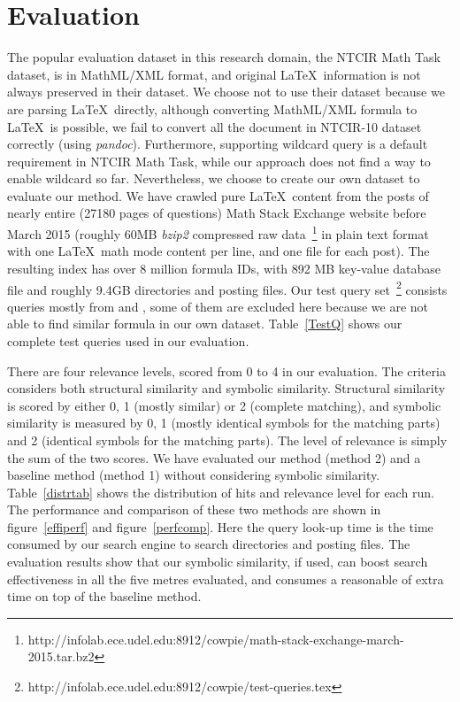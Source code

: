 \documentclass{acm_proc_article-sp}
\begin{document}
\section{Evaluation}
The popular evaluation dataset in this research domain, the NTCIR Math Task dataset, is in MathML/XML format, and original \LaTeX\ information is not always preserved in their dataset. 
We choose not to use their dataset because we are parsing \LaTeX\ directly, although converting MathML/XML formula to \LaTeX\ is possible, we fail to convert all the document in NTCIR-10 dataset correctly (using \textit{pandoc}).
Furthermore, supporting wildcard query is a default requirement in NTCIR Math Task, while our approach does not find a way to enable wildcard so far.
Nevertheless, we choose to create our own dataset to evaluate our method.
We have crawled pure \LaTeX\ content from the posts of nearly entire (27180 pages of questions) Math Stack Exchange website before March 2015 (roughly 60MB \textit{bzip2} compressed raw data~\footnote{http://infolab.ece.udel.edu:8912/cowpie/math-stack-exchange-march-2015.tar.bz2} in plain text format with one \LaTeX\ math mode content per line, and one file for each post). 
The resulting index has over 8 million formula IDs, with 892 MB key-value database file and roughly 9.4GB directories and posting files.
Our test query set~\footnote{http://infolab.ece.udel.edu:8912/cowpie/test-queries.tex} consists queries mostly from \cite{ntcirtopic} and \cite{symbolpairs15}, some of them are excluded here because we are not able to find similar formula in our own dataset.
Table~\ref{TestQ} shows our complete test queries used in our evaluation. 

There are four relevance levels, scored from 0 to 4 in our evaluation.
The criteria considers both structural similarity and symbolic similarity. 
Structural similarity is scored by either 0, 1 (mostly similar) or 2 (complete matching), 
and symbolic similarity is measured by 0, 1 (mostly identical symbols for the matching parts) and 2 (identical symbols for the matching parts).
The level of relevance is simply the sum of the two scores.
We have evaluated our method (method 2) and a baseline method (method 1) without considering symbolic similarity.
Table~\ref{distrtab} shows the distribution of hits and relevance level for each run.
The performance and comparison of these two methods are shown in figure~\ref{effiperf} and figure~\ref{perfcomp}. 
Here the query look-up time is the time consumed by our search engine to search directories and posting files.
The evaluation results show that our symbolic similarity, if used, can boost search effectiveness in all the five metres evaluated, 
and consumes a reasonable of extra time on top of the baseline method. 
\end{document}
